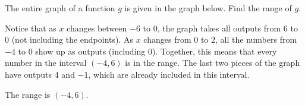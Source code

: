 \documentclass[nooutcomes]{ximera}
\begin{document}
	\begin{example}
		The entire graph of a function $g$ is given in the graph below. Find the range of $g$.
		\begin{image}
		\end{image}
		
		\begin{explanation}
			
			\begin{center}
			\end{center}
				
			Notice that as $x$ changes between $-6$ to $0$, the graph takes all outputs from $6$ to $0$ (not including the endpoints). As $x$
			changes from $0$ to $2$, all the numbers from $-4$ to $0$ show up as outputs (including $0$). Together, this means that every
			number in the interval $(-4, 6)$ is in the range. The last two pieces of the graph have outputs $4$ and $-1$, which are already included
			in this interval.
			
			The range is $(-4, 6)$.
			
		\end{explanation}
	\end{example}
\end{document}
